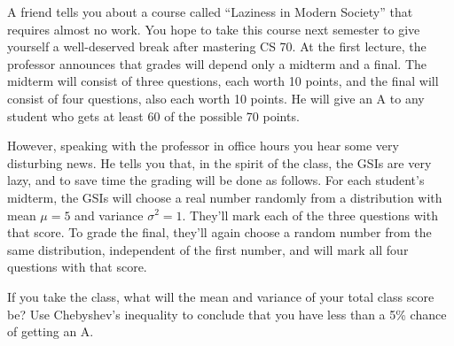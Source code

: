 
A friend tells you about a course called ``Laziness in Modern Society''
that requires almost no work.  You hope to take this course next semester to give yourself a well-deserved break after mastering CS 70. At the first lecture, the professor
announces that grades will depend only a midterm and a final. The midterm
will consist of three questions, each worth 10 points, and the final
will consist of four questions, also each worth 10 points. He will give
an A to any student who gets at least 60 of the possible 70 points.

However, speaking with the professor in office hours you hear some
very disturbing news. He tells you that, in the spirit of the class, the GSIs are very lazy, and to save time the grading will be
done as follows. For each student's midterm, the GSIs will choose a real
number randomly from a distribution with mean $\mu = 5$ and variance
$\sigma^2 = 1$.
They'll mark each of the three questions with that score. To grade the
final, they'll again choose a random number from the same distribution,
independent of the first number, and will mark all four questions with
that score.

If you take the class, what will the mean and variance of your total
class score be? Use Chebyshev's inequality to conclude that you have less than a 5\% chance of
getting an A.
\nosolspace{1.5cm}




